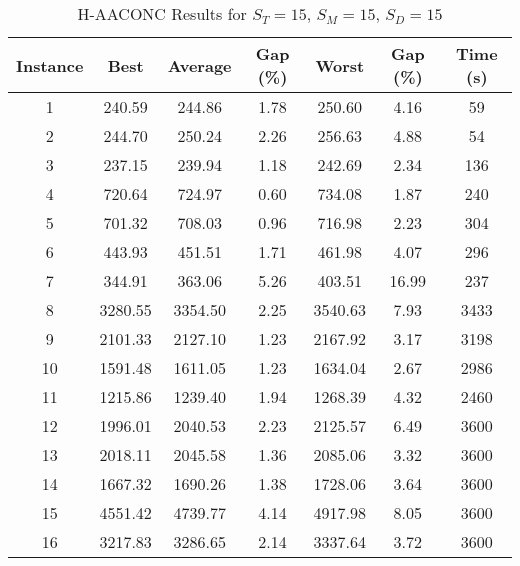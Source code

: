 \begin{table}[h]
	\centering
	\caption{H-AACONC Results for $S_T=15$, $S_M=15$, $S_D=15$}
	\begin{tabular}{@{}ccccccc@{}}
		\midrule
		\textbf{Instance} & \textbf{Best} & \textbf{Average} & \textbf{Gap (\%)} & \textbf{Worst} & \textbf{Gap (\%)} & \textbf{Time (s)} \\ \midrule
		1  & 240.59 & 244.86 & 1.78 & 250.60 & 4.16 & 59   \\ \midrule
		2  & 244.70 & 250.24 & 2.26 & 256.63 & 4.88 & 54  \\ \midrule
		3  & 237.15 & 239.94 & 1.18 & 242.69 & 2.34 & 136  \\ \midrule
		4  & 720.64 & 724.97 & 0.60 & 734.08 & 1.87 & 240  \\ \midrule
		5  & 701.32 & 708.03 & 0.96 & 716.98 & 2.23 & 304  \\ \midrule
		6  & 443.93 & 451.51 & 1.71 & 461.98 & 4.07 & 296  \\ \midrule
		7  & 344.91 & 363.06 & 5.26 & 403.51 & 16.99 & 237  \\ \midrule
		8  & 3280.55 & 3354.50 & 2.25 & 3540.63 & 7.93 & 3433  \\ \midrule
		9  & 2101.33 & 2127.10 & 1.23 & 2167.92 & 3.17 & 3198  \\ \midrule
		10 & 1591.48 & 1611.05 & 1.23 & 1634.04 & 2.67 & 2986  \\ \midrule
		11 & 1215.86 & 1239.40 & 1.94 & 1268.39 & 4.32 & 2460  \\ \midrule
		12 & 1996.01 & 2040.53 & 2.23 & 2125.57 & 6.49 & 3600  \\ \midrule
		13 & 2018.11 & 2045.58 & 1.36 & 2085.06 & 3.32 & 3600  \\ \midrule
		14 & 1667.32 & 1690.26 & 1.38 & 1728.06 & 3.64 & 3600  \\ \midrule
		15 & 4551.42 & 4739.77 & 4.14 & 4917.98 & 8.05 & 3600  \\ \midrule
		16 & 3217.83 & 3286.65 & 2.14 & 3337.64 & 3.72 & 3600  \\ \midrule
	\end{tabular}
	\label{table:ACO_15-15-15}
\end{table}